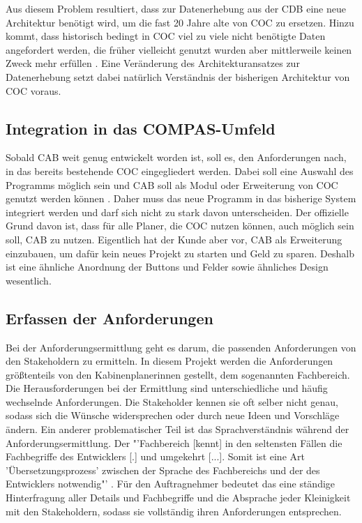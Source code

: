 \documentclass [12pt, a4paper, oneside, titlepage, ngerman]{article}
\begin{document}
\noindent Aus diesem Problem resultiert, dass zur Datenerhebung aus der \ac{CDB} eine neue Architektur benötigt wird, um die fast 20 Jahre alte von \ac{COC} zu ersetzen. Hinzu kommt, dass historisch bedingt in \ac{COC} viel zu viele nicht benötigte Daten angefordert werden, die früher vielleicht genutzt wurden aber mittlerweile keinen Zweck mehr erfüllen \cite[vgl.][]{Gespraech3}. Eine Veränderung des Architekturansatzes zur Datenerhebung setzt dabei natürlich Verständnis der bisherigen Architektur von \ac{COC} voraus.

\subsection{Integration in das COMPAS-Umfeld}
Sobald \ac{CAB} weit genug entwickelt worden ist, soll es, den Anforderungen nach, in das bereits bestehende \ac{COC} eingegliedert werden. Dabei soll eine Auswahl des Programms möglich sein und \ac{CAB} soll als Modul oder Erweiterung von \ac{COC} genutzt werden können \cite[vgl.][S.6]{anwenderkonzept}. Daher muss das neue Programm in das bisherige System integriert werden und darf sich nicht zu stark davon unterscheiden. Der offizielle Grund davon ist, dass für alle Planer, die \ac{COC} nutzen können, auch möglich sein soll, \ac{CAB} zu nutzen. Eigentlich hat der Kunde aber vor, \ac{CAB} als Erweiterung einzubauen, um dafür kein neues Projekt zu starten und Geld zu sparen. Deshalb ist eine ähnliche Anordnung der Buttons und Felder sowie ähnliches Design wesentlich. \\



\subsection{Erfassen der Anforderungen} 
Bei der Anforderungsermittlung geht es darum, die passenden Anforderungen von den Stakeholdern zu ermitteln. In diesem Projekt werden die Anforderungen größtenteils von den Kabinenplanerinnen gestellt, dem sogenannten Fachbereich. \\
Die Herausforderungen bei der Ermittlung sind unterschiedliche und häufig wechselnde Anforderungen. Die Stakeholder kennen sie oft selber nicht genau, sodass sich die Wünsche widersprechen oder durch neue Ideen und Vorschläge ändern.%
Ein anderer problematischer Teil ist das Sprachverständnis während der Anforderungsermittlung. Der "'Fachbereich [kennt] in den seltensten Fällen die Fachbegriffe des Entwicklers [.] und umgekehrt [...]. Somit ist eine Art 'Übersetzungsprozess' zwischen der Sprache des Fachbereichs und der des Entwicklers notwendig"' \cite[S.319]{Alpar2016} . 
Für den Auftragnehmer bedeutet das eine ständige Hinterfragung aller Details und Fachbegriffe und die Absprache jeder Kleinigkeit mit den Stakeholdern, sodass sie vollständig ihren Anforderungen entsprechen. \\
\end{document}
